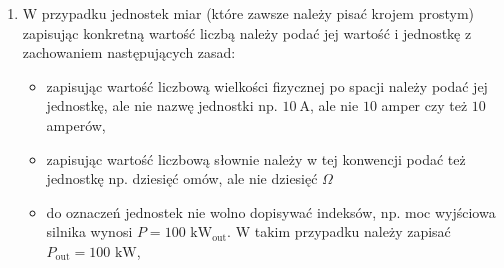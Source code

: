 \documentclass[12pt,twoside]{article}
\begin{document}
\begin{enumerate}[label=\arabic*), leftmargin=1.25cm]
\begin{itemize}[label={--},labelsep=0.4cm,leftmargin=0.6cm]
\item wszystkie cyfry,

\item symbole konkretnych funkcji np. $\mathrm{tg\ } \omega t$, a nie $tg \omega t$,

\item operatory operacji matematycznych np. pochodne zwyczajne $\frac{\mathrm{d} x}{\mathrm{d} t}$, a nie $\frac{d x}{d t}$,

\item symbole liczb o konkretnej wartości np. przenikalność elektryczna próżni $\varepsilon_0 = 8,8542 \cdot 10^{-12}$ $\mathrm{F} \cdot \mathrm{m}^{-1}$, a nie $\varepsilon_0 = 8,8542 \cdot 10^{-12}$ $\mathrm{F} \cdot \mathrm{m}^{-1}$,

\item indeksy, jeżeli odnoszą się do: obiektów (fizycznych, geometrycznych), czyli, np. natężenie pola elektrycznego w punkcie A to $E_\mathrm{A}$, a nie $E_A$, zjawisk lub stanów fizycznych, np. moment obciążenia to $T_\mathrm{L}$, a nie $T_L$, do nazwisk czy też oznaczeń pierwiastków, np. straty w miedzi to $P_{\mathrm{Cu}}$ a nie $P_{Cu}$, do charakteru wielkości symbolizowanej przez literę źródłową, np. wartość maksymalna siły to $F_\mathrm{max}$, a nie $F_{max}$, oznaczeń jednostek miary np. $\mathrm{M}\Omega$, a nie $M \mathit{\Omega}$.

\end{itemize}

\item W przypadku jednostek miar (które zawsze należy pisać krojem prostym) zapisując konkretną wartość liczbą należy podać jej wartość i jednostkę z zachowaniem następujących zasad:

\begin{itemize}[label={--},labelsep=0.4cm,leftmargin=0.6cm]
\item zapisując wartość liczbową wielkości fizycznej po spacji należy podać jej jednostkę, ale nie nazwę jednostki np. $10~\mathrm{A}$, ale nie $10$ amper czy też $10$ amperów,

\item zapisując wartość liczbową słownie należy w tej konwencji podać też jednostkę np. dziesięć omów, ale nie dziesięć $\Omega$

\item do oznaczeń jednostek nie wolno dopisywać indeksów, np. moc wyjściowa silnika wynosi $P=100$ $\mathrm{kW}_\mathrm{out}$. W takim przypadku należy zapisać $P_\mathrm{out}=100$ $\mathrm{kW}$,


\end{itemize}
\end{enumerate}
\end{document}

